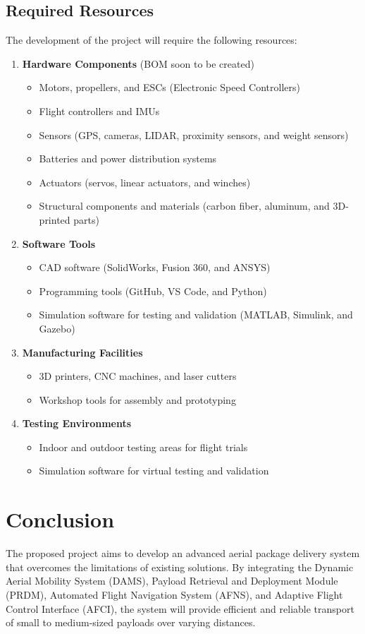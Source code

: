 \documentclass[12pt]{article}
\begin{document}
\subsection{Required Resources}
The development of the project will require the following resources:
\begin{enumerate}
    \item \textbf{Hardware Components} (BOM soon to be created) 
    \begin{itemize}
        \item Motors, propellers, and ESCs (Electronic Speed Controllers)
        \item Flight controllers and IMUs
        \item Sensors (GPS, cameras, LIDAR, proximity sensors, and weight sensors)
        \item Batteries and power distribution systems
        \item Actuators (servos, linear actuators, and winches)
        \item Structural components and materials (carbon fiber, aluminum, and 3D-printed parts)
    \end{itemize}
    \item \textbf{Software Tools}
    \begin{itemize}
        \item CAD software (SolidWorks, Fusion 360, and ANSYS)
        \item Programming tools (GitHub, VS Code, and Python)
        \item Simulation software for testing and validation (MATLAB, Simulink, and Gazebo)
    \end{itemize}
    \item \textbf{Manufacturing Facilities}
    \begin{itemize}
        \item 3D printers, CNC machines, and laser cutters
        \item Workshop tools for assembly and prototyping
    \end{itemize}
    \item \textbf{Testing Environments}
    \begin{itemize}
        \item Indoor and outdoor testing areas for flight trials
        \item Simulation software for virtual testing and validation
    \end{itemize}
\end{enumerate}

\section{Conclusion}
The proposed project aims to develop an advanced aerial package delivery system that overcomes the limitations of existing solutions. By integrating the Dynamic Aerial Mobility System (DAMS), Payload Retrieval and Deployment Module (PRDM), Automated Flight Navigation System (AFNS), and Adaptive Flight Control Interface (AFCI), the system will provide efficient and reliable transport of small to medium-sized payloads over varying distances.
\end{document}
